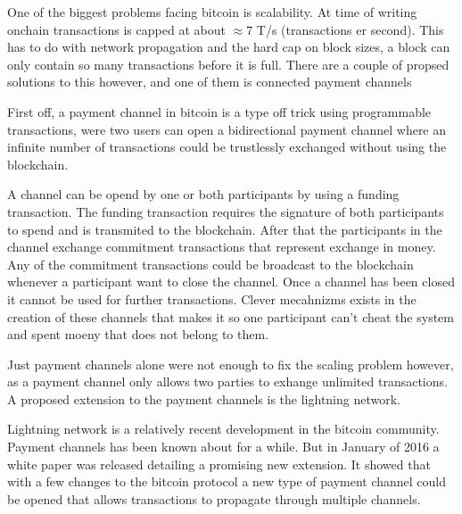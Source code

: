 
One of the biggest problems facing bitcoin is scalability. At time of writing
onchain transactions is capped at about $\approx 7$ T/s (transactions er second).\cite{scaling}
This has to do with network propagation and the hard cap on block sizes, a block
can only contain so many transactions before it is full. There are a couple of
propsed solutions to this however, and one of them is connected payment channels

First off, a payment channel in bitcoin is a type off trick using programmable transactions, 
were two users can open a bidirectional payment channel where an infinite number of transactions 
could be trustlessly exchanged without using the blockchain. 

A channel can be opend by one or both participants by using a funding transaction. The funding 
transaction requires the signature of both participants to spend and is transmited to the blockchain. 
After that the participants in the channel exchange commitment transactions that represent exchange in money.
Any of the commitment transactions could be broadcast to the blockchain whenever a participant 
want to close the channel. Once a channel has been closed it cannot be used for further transactions.
Clever mecahnizms exists in the creation of these channels that makes it so one participant 
can't cheat the system and spent moeny that does not belong to them.

Just payment channels alone were not enough to fix the scaling problem however, as a payment channel 
only allows two parties to exhange unlimited transactions. A proposed extension to the 
payment channels is the lightning network.

Lightning network is a relatively recent development in the bitcoin community.
Payment channels has been known about for a while. But in
January of 2016 a white paper was released detailing a promising new extension.\cite{lightningnetwork_2019}
It showed that with a few changes to the bitcoin protocol a new type of
payment channel could be opened that allows transactions to propagate through multiple channels.\cite{lightningnetwork_2019}

